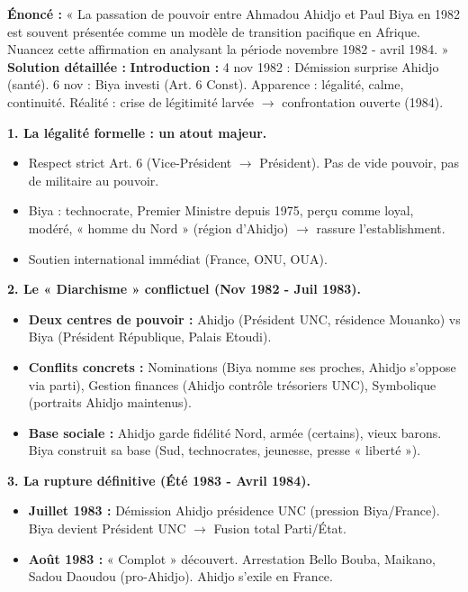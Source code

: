 \documentclass[11pt]{article}
\begin{document}
\begin{exoresolu}
\textbf{Énoncé :} « La passation de pouvoir entre Ahmadou Ahidjo et Paul Biya en 1982 est souvent présentée comme un modèle de transition pacifique en Afrique. Nuancez cette affirmation en analysant la période novembre 1982 - avril 1984. »
\tcblower
\textbf{Solution détaillée :}
\textbf{Introduction :} 4 nov 1982 : Démission surprise Ahidjo (santé). 6 nov : Biya investi (Art. 6 Const). Apparence : légalité, calme, continuité. Réalité : crise de légitimité larvée $\rightarrow$ confrontation ouverte (1984).
\par
\textbf{1. La légalité formelle : un atout majeur.}
\begin{itemize}
    \item Respect strict Art. 6 (Vice-Président $\rightarrow$ Président). Pas de vide pouvoir, pas de militaire au pouvoir.
    \item Biya : technocrate, Premier Ministre depuis 1975, perçu comme loyal, modéré, « homme du Nord » (région d'Ahidjo) $\rightarrow$ rassure l'establishment.
    \item Soutien international immédiat (France, ONU, OUA).
\end{itemize}
\textbf{2. Le « Diarchisme » conflictuel (Nov 1982 - Juil 1983).}
\begin{itemize}
    \item \textbf{Deux centres de pouvoir :} Ahidjo (Président UNC, résidence Mouanko) vs Biya (Président République, Palais Etoudi).
    \item \textbf{Conflits concrets :} Nominations (Biya nomme ses proches, Ahidjo s'oppose via parti), Gestion finances (Ahidjo contrôle trésoriers UNC), Symbolique (portraits Ahidjo maintenus).
    \item \textbf{Base sociale :} Ahidjo garde fidélité Nord, armée (certains), vieux barons. Biya construit sa base (Sud, technocrates, jeunesse, presse « liberté »).
\end{itemize}
\textbf{3. La rupture définitive (Été 1983 - Avril 1984).}
\begin{itemize}
    \item \textbf{Juillet 1983 :} Démission Ahidjo présidence UNC (pression Biya/France). Biya devient Président UNC $\rightarrow$ Fusion total Parti/État.
    \item \textbf{Août 1983 :} « Complot » découvert. Arrestation Bello Bouba, Maikano, Sadou Daoudou (pro-Ahidjo). Ahidjo s'exile en France.

\end{itemize}
\end{exoresolu}
\end{document}
